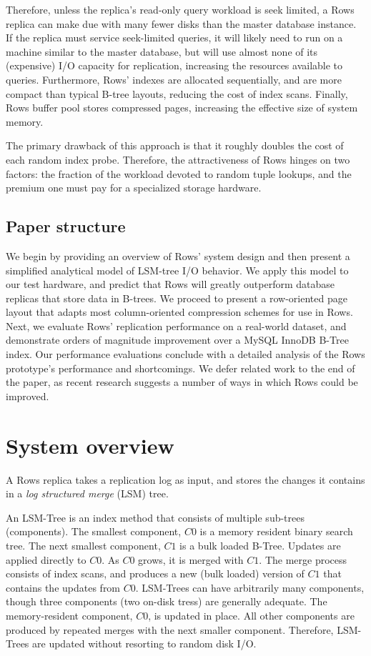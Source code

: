 \documentclass{sig-alternate-sigmod08}
\newcommand{\rows}{Rows\xspace}
\newcommand{\rowss}{Rows'\xspace}
\begin{document}
Therefore, unless the replica's read-only query workload is seek
limited, a \rows replica can make due with many fewer disks than the
master database instance.  If the replica must service seek-limited
queries, it will likely need to run on a machine similar to the master
database, but will use almost none of its (expensive) I/O capacity for
replication, increasing the resources available to queries.
Furthermore, \rowss indexes are allocated sequentially, and are more
compact than typical B-tree layouts, reducing the cost of index scans.
Finally, \rows buffer pool stores compressed pages, increasing the
effective size of system memory.

The primary drawback of this approach is that it roughly doubles the
cost of each random index probe.  Therefore, the attractiveness of
\rows hinges on two factors: the fraction of the workload devoted to
random tuple lookups, and the premium one must pay for a specialized
storage hardware.

\subsection{Paper structure}

We begin by providing an overview of \rowss system design and then
present a simplified analytical model of LSM-tree I/O behavior.  We
apply this model to our test hardware, and predict that \rows will
greatly outperform database replicas that store data in B-trees.  We
proceed to present a row-oriented page layout that adapts most
column-oriented compression schemes for use in \rows.  Next, we
evaluate \rowss replication performance on a real-world dataset, and
demonstrate orders of magnitude improvement over a MySQL InnoDB B-Tree
index.  Our performance evaluations conclude with a detailed analysis
of the \rows prototype's performance and shortcomings.  We defer
related work to the end of the paper, as recent research suggests
a number of ways in which \rows could be improved.

\section{System overview}

A \rows replica takes a replication log as input, and stores the
changes it contains in a {\em log structured merge} (LSM)
tree\cite{lsm}.

An LSM-Tree is an index method that consists of multiple sub-trees
(components).  The smallest component, $C0$ is a memory resident
binary search tree.  The next smallest component, $C1$ is a bulk
loaded B-Tree.  Updates are applied directly to $C0$.  As $C0$ grows,
it is merged with $C1$.  The merge process consists of index scans,
and produces a new (bulk loaded) version of $C1$ that contains the
updates from $C0$.  LSM-Trees can have arbitrarily many components,
though three components (two on-disk tress) are generally adequate.
The memory-resident component, $C0$, is updated in place.  All other
components are produced by repeated merges with the next smaller
component.  Therefore, LSM-Trees are updated without resorting to
random disk I/O.
\end{document}

